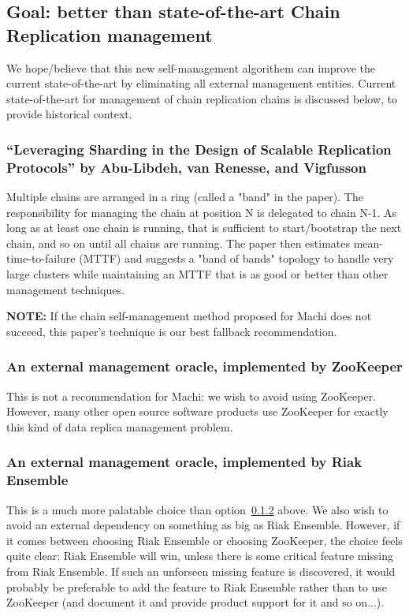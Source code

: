 \documentclass[preprint,10pt]{sigplanconf}
\begin{document}
\subsection{Goal: better than state-of-the-art Chain Replication management}

We hope/believe that this new self-management algorithem can improve
the current state-of-the-art by eliminating all external management
entities.  Current state-of-the-art for management of chain
replication chains is discussed below, to provide historical context.

\subsubsection{``Leveraging Sharding in the Design of Scalable Replication Protocols'' by Abu-Libdeh, van Renesse, and Vigfusson}
\label{ssec:elastic-replication}
Multiple chains are arranged in a ring (called a "band" in the paper).
The responsibility for managing the chain at position N is delegated
to chain N-1.  As long as at least one chain is running, that is
sufficient to start/bootstrap the next chain, and so on until all
chains are running.  The paper then estimates mean-time-to-failure
(MTTF) and suggests a "band of bands" topology to handle very large
clusters while maintaining an MTTF that is as good or better than
other management techniques.

{\bf NOTE:} If the chain self-management method proposed for Machi does not
succeed, this paper's technique is our best fallback recommendation.

\subsubsection{An external management oracle, implemented by ZooKeeper}
\label{ssec:an-oracle}
This is not a recommendation for Machi: we wish to avoid using ZooKeeper.
However, many other open source software products use
ZooKeeper for exactly this kind of data replica management problem.

\subsubsection{An external management oracle, implemented by Riak Ensemble}

This is a much more palatable choice than option~\ref{ssec:an-oracle}
above.  We also
wish to avoid an external dependency on something as big as Riak
Ensemble.  However, if it comes between choosing Riak Ensemble or
choosing ZooKeeper, the choice feels quite clear: Riak Ensemble will
win, unless there is some critical feature missing from Riak
Ensemble.  If such an unforseen missing feature is discovered, it
would probably be preferable to add the feature to Riak Ensemble
rather than to use ZooKeeper (and document it and provide product
support for it and so on...).
\end{document}
